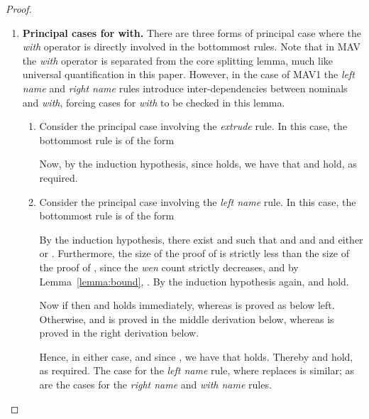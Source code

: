 \begin{proof}
\begin{enumerate}[label=\textbf{\Alph*},ref=\Alph*,leftmargin=*]
Now observe that the following two proofs can be constructed.

Furthermore,

and 
,
since  and .
Also, by Lemma~\ref{lemma:bound}, the following inequality holds.

Hence both

and  hold.
Thereby the size of each of the above proofs is strictly bounded above by the size of the proof of .




\item \textbf{Principal cases for with.}
There are three forms of principal case where the \textit{with} operator is directly involved in the bottommost rules.
Note that in \textsf{MAV} the \textit{with} operator is separated from the core splitting lemma, much like universal quantification in this paper.
However, in the case of \textsf{MAV1} the \textit{left name} and \textit{right name} rules introduce inter-dependencies between nominals and \textit{with}, forcing cases for \textit{with} to be checked in this lemma.

\begin{enumerate}[label*=\textbf{.\arabic*}]

\item Consider the principal case involving the \textit{extrude} rule.
In this case, the bottommost rule is of the form 

Now, by the induction hypothesis, 
since  holds, we have that 
 and  hold, as required.



\item Consider the principal case involving the \textit{left name} rule.
In this case, the bottommost rule is of the form 
 
By the induction hypothesis, there exist  and  such that
 and  and  
and either  or . Furthermore, the size of the proof of  is strictly less than the size of the proof of , since the \textit{wen} count strictly decreases, and by Lemma~\ref{lemma:bound}, .
By the induction hypothesis again,  and  hold.


Now if  then  and  holds immediately, whereas 
 is proved as below left. Otherwise,  and
 is proved in the middle derivation below, whereas  is proved in the right derivation below.




Hence, in either case,  
and since ,
we have that  holds.
Thereby  and  hold, as required.
The case for the \textit{left name} rule, where  replaces  is similar; as are the cases for the \textit{right name} and \textit{with name} rules.



\end{enumerate}
\end{enumerate}
\end{proof}
